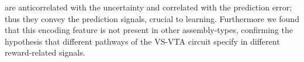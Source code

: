 are anticorrelated with the uncertainty and correlated with the prediction error; thus they convey the prediction signals, crucial to learning. Furthermore we found that this encoding feature is not present in other assembly-types, confirming the hypothesis that different pathways of the VS-VTA circuit specify in different reward-related signals.